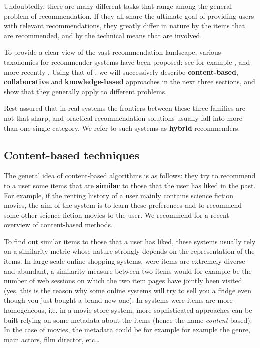 Undoubtedly, there are many different tasks that range among the general problem
of recommendation. If they all share the ultimate goal of providing users with
relevant recommendations, they greatly differ in nature by the items that are
recommended, and by the technical means that are involved.

To provide a clear view of the vast recommendation landscape, various taxonomies
for recommender systems have been proposed: see for example \cite{Bur02,
AdoTuzIEEE2005, Bur07}, and more recently \cite{BurRam11}. Using that of
\cite{BurRam11}, we will successively describe \textbf{content-based},
\textbf{collaborative} and \textbf{knowledge-based} approaches in the next
three sections, and show that they generally apply to different problems.

Rest assured that in real systems the frontiers between these three families
are not that sharp, and practical recommendation solutions usually fall into
more than one single category. We refer to such systems as \textbf{hybrid}
recommenders.

\subsection{Content-based techniques}

The general idea of content-based algorithms is as follows: they try to recommend to a user some items that are
\textbf{similar} to those that the user has liked in the past. For example, if
the renting history of a user mainly contains science fiction movies, the aim
of the system is to learn these preferences and to recommend some other science
fiction movies to the user. We recommend \cite{LopGemSem11} for a recent
overview of content-based methods.

To find out similar items to those that a user has liked, these systems usually
rely on a similarity metric whose nature strongly depends on the representation
of the items. In large-scale online shopping systems, were items are extremely
diverse and abundant, a similarity measure between two items would for
example be the number of web sessions on which the two item pages have jointly
been visited (yes, this is the reason why some online systems will try to sell
you a fridge even though you just bought a brand new one). In systems were
items are more homogeneous, i.e. in a movie store system, more  sophisticated
approaches can be built relying on some metadata about the items (hence the
name \textit{content}-based). In the case of movies, the metadata could be for
example for example the genre, main actors, film director, etc\dots

